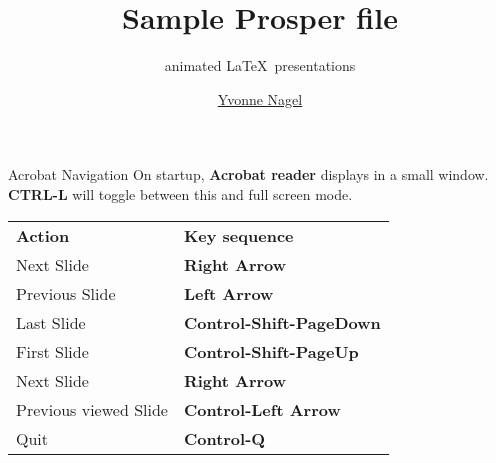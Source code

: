 \documentclass[pdf,serpaggi,slideColor,colorBG]{prosper}
\begin{document}
\title{Sample Prosper file}
\subtitle{animated \LaTeX\ presentations}
\author{\href{http://www.math.wisc.edu/~ynagel}{{\red Yvonne Nagel}}}
\maketitle


\begin{slide}{Acrobat Navigation}
On startup, {\bf Acrobat reader} displays in a small window.
{\bf CTRL-L} will toggle between this and full screen mode.

\begin{tabular}{ll}
{\bf Action} & {\bf Key sequence}\\
Next Slide & {\bf Right Arrow}\\
Previous Slide & {\bf Left Arrow}\\
Last Slide & {\bf Control-Shift-PageDown}\\
First Slide & {\bf Control-Shift-PageUp}\\
Next Slide & {\bf Right Arrow}\\
Previous viewed Slide & {\bf Control-Left Arrow}\\
Quit & {\bf Control-Q}\\
\end{tabular}
\end{slide}
\end{document}
